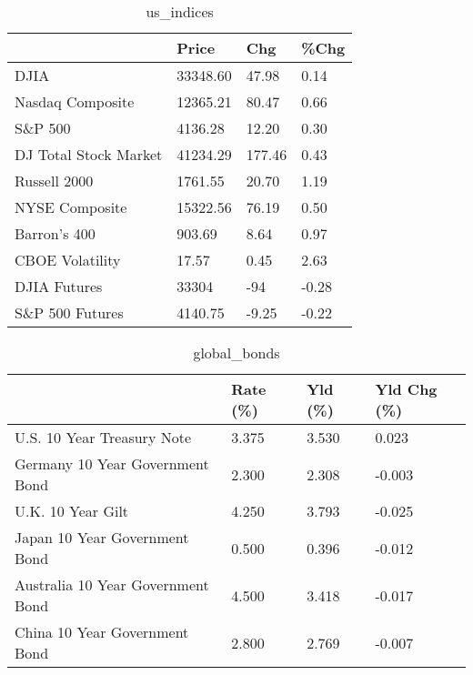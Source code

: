 \documentclass{article}%
\begin{document}
%


\begin{table}[htbp]%
\caption{us\_indices}%
\centering%
\begin{adjustbox}{width=1\textwidth}%
\begin{tabular}{llll}
\toprule
                      &    Price &    Chg &  \%Chg \\
\midrule
                 DJIA & 33348.60 &  47.98 &  0.14 \\
     Nasdaq Composite & 12365.21 &  80.47 &  0.66 \\
              S\&P 500 &  4136.28 &  12.20 &  0.30 \\
DJ Total Stock Market & 41234.29 & 177.46 &  0.43 \\
         Russell 2000 &  1761.55 &  20.70 &  1.19 \\
       NYSE Composite & 15322.56 &  76.19 &  0.50 \\
         Barron's 400 &   903.69 &   8.64 &  0.97 \\
      CBOE Volatility &    17.57 &   0.45 &  2.63 \\
         DJIA Futures &    33304 &    -94 & -0.28 \\
      S\&P 500 Futures &  4140.75 &  -9.25 & -0.22 \\
\bottomrule
\end{tabular}
%
\end{adjustbox}%
\end{table}

%


\begin{table}[htbp]%
\caption{global\_bonds}%
\centering%
\begin{adjustbox}{width=1\textwidth}%
\begin{tabular}{llll}
\toprule
                                  & Rate (\%) & Yld (\%) & Yld Chg (\%) \\
\midrule
       U.S. 10 Year Treasury Note &    3.375 &   3.530 &       0.023 \\
  Germany 10 Year Government Bond &    2.300 &   2.308 &      -0.003 \\
                U.K. 10 Year Gilt &    4.250 &   3.793 &      -0.025 \\
    Japan 10 Year Government Bond &    0.500 &   0.396 &      -0.012 \\
Australia 10 Year Government Bond &    4.500 &   3.418 &      -0.017 \\
    China 10 Year Government Bond &    2.800 &   2.769 &      -0.007 \\
\bottomrule
\end{tabular}
%
\end{adjustbox}%
\end{table}
\end{document}
